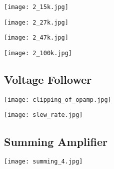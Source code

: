 \documentclass{article}
\begin{document}
\begin{center}
\texttt{[image: 2\_15k.jpg]}
\label{15knoninvert}
\end{center}
\vspace{10pt}

\begin{center}
\texttt{[image: 2\_27k.jpg]}
\label{27knoninvert}
\end{center}
\vspace{10pt}

\begin{center}
\texttt{[image: 2\_47k.jpg]}
\label{47knoninvert}
\end{center}
\vspace{10pt}

\begin{center}
\texttt{[image: 2\_100k.jpg]}
\label{100knoninvert}
\end{center}
\vspace{10pt}


\subsection{Voltage Follower}

\begin{center}
\texttt{[image: clipping\_of\_opamp.jpg]}
\label{clip27k}
\end{center}
\vspace{10pt}

\begin{center}
\texttt{[image: slew\_rate.jpg]}
\label{followslew}
\end{center}
\vspace{10pt}

\subsection{Summing Amplifier}

\begin{center}
\texttt{[image: summing\_4.jpg]}
\label{summing}
\end{center}
\vspace{10pt}
\end{document}
